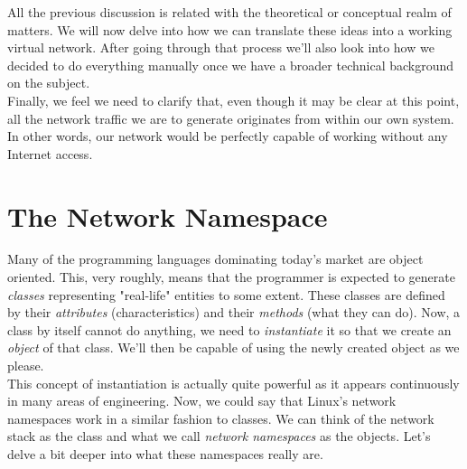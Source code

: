         All the previous discussion is related with the theoretical or conceptual realm of matters. We will now delve into how we can translate these ideas into a working virtual network. After going through that process we'll also look into how we decided to do everything manually once we have a broader technical background on the subject.\\

        Finally, we feel we need to clarify that, even though it may be clear at this point, all the network traffic we are to generate originates from within our own system. In other words, our network would be perfectly capable of working without any Internet access.\\

    \section{The Network Namespace}


        Many of the programming languages dominating today's market are object oriented. This, very roughly, means that the programmer is expected to generate \textit{classes} representing "real-life" entities to some extent. These classes are defined by their \textit{attributes} (characteristics) and their \textit{methods} (what they can do). Now, a class by itself cannot do anything, we need to \textit{instantiate} it so that we create an \textit{object} of that class. We'll then be capable of using the newly created object as we please.\\

        This concept of instantiation is actually quite powerful as it appears continuously in many areas of engineering. Now, we could say that Linux's network namespaces work in a similar fashion to classes. We can think of the network stack as the class and what we call \textit{network namespaces} as the objects. Let's delve a bit deeper into what these namespaces really are.\\

